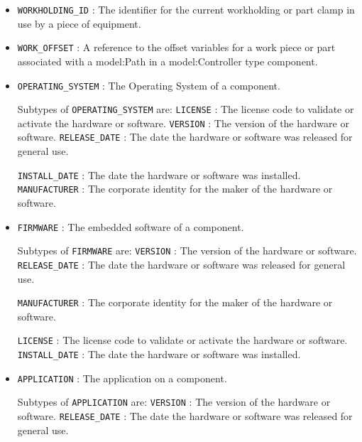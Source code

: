 \begin{itemize}
\item \texttt{WORKHOLDING_ID} : The identifier for the current workholding or part clamp in use by a piece of equipment. 

\item \texttt{WORK_OFFSET} : A reference to the offset variables for a work piece or part associated with a {model:Path} in a {model:Controller} type component. 

\item \texttt{OPERATING_SYSTEM} : The Operating System of a component. 

Subtypes of \texttt{OPERATING_SYSTEM} are: 
\newline\tab \texttt{LICENSE} : The license code to validate or activate the hardware or software. 
\newline\tab \texttt{VERSION} : The version of the hardware or software. 
\newline\tab \texttt{RELEASE_DATE} : The date the hardware or software was released for general use.
 
\newline\tab \texttt{INSTALL_DATE} : The date the hardware or software was installed. 
\newline\tab \texttt{MANUFACTURER} : The corporate identity for the maker of the hardware or software.
 
\item \texttt{FIRMWARE} : The embedded software of a component.
 

Subtypes of \texttt{FIRMWARE} are: 
\newline\tab \texttt{VERSION} : The version of the hardware or software. 
\newline\tab \texttt{RELEASE_DATE} : The date the hardware or software was released for general use.
 
\newline\tab \texttt{MANUFACTURER} : The corporate identity for the maker of the hardware or software.
 
\newline\tab \texttt{LICENSE} : The license code to validate or activate the hardware or software. 
\newline\tab \texttt{INSTALL_DATE} : The date the hardware or software was installed. 
\item \texttt{APPLICATION} : The application on a component. 

Subtypes of \texttt{APPLICATION} are: 
\newline\tab \texttt{VERSION} : The version of the hardware or software. 
\newline\tab \texttt{RELEASE_DATE} : The date the hardware or software was released for general use.
 

\end{itemize}

